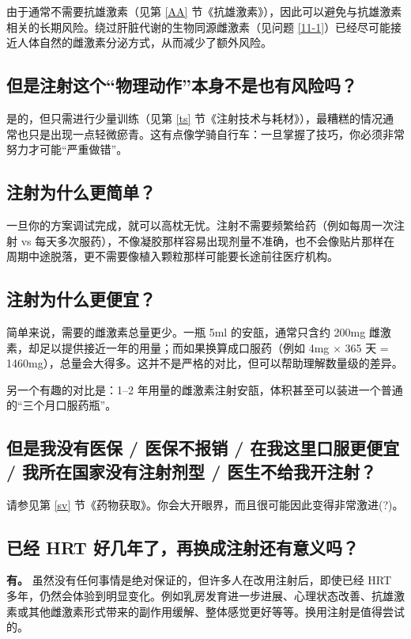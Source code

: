 \documentclass{article}
\begin{document}
由于通常不需要抗雄激素（见第 \ref{AA} 节《抗雄激素》），因此可以避免与抗雄激素相关的长期风险。绕过肝脏代谢的生物同源雌激素（见问题 \ref{11-1}）已经尽可能接近人体自然的雌激素分泌方式，从而减少了额外风险。

\subsection{但是注射这个“物理动作”本身不是也有风险吗？}

是的，但只需进行少量训练（见第 \ref{ts} 节《注射技术与耗材》），最糟糕的情况通常也只是出现一点轻微瘀青。这有点像学骑自行车：一旦掌握了技巧，你必须非常努力才可能“严重做错”。

\subsection{注射为什么更简单？}

一旦你的方案调试完成，就可以高枕无忧。注射不需要频繁给药（例如每周一次注射 vs 每天多次服药），不像凝胶那样容易出现剂量不准确，也不会像贴片那样在周期中途脱落，更不需要像植入颗粒那样可能要长途前往医疗机构。

\subsection{注射为什么更便宜？}

简单来说，需要的雌激素总量更少。一瓶 5ml 的安瓿，通常只含约 200mg 雌激素，却足以提供接近一年的用量；而如果换算成口服药（例如 4mg × 365 天 = 1460mg），总量会大得多。这并不是严格的对比，但可以帮助理解数量级的差异。

另一个有趣的对比是：1–2 年用量的雌激素注射安瓿，体积甚至可以装进一个普通的“三个月口服药瓶”。

\subsection{但是我没有医保 / 医保不报销 / 在我这里口服更便宜 / 我所在国家没有注射剂型 / 医生不给我开注射？}

请参见第 \ref{sv} 节《药物获取》。你会大开眼界，而且很可能因此变得非常激进(?)。

\subsection{已经 HRT 好几年了，再换成注射还有意义吗？}

\textbf{有。} 虽然没有任何事情是绝对保证的，但许多人在改用注射后，即使已经 HRT 多年，仍然会体验到明显变化。例如乳房发育进一步进展、心理状态改善、抗雄激素或其他雌激素形式带来的副作用缓解、整体感觉更好等等。换用注射是值得尝试的。
\end{document}
